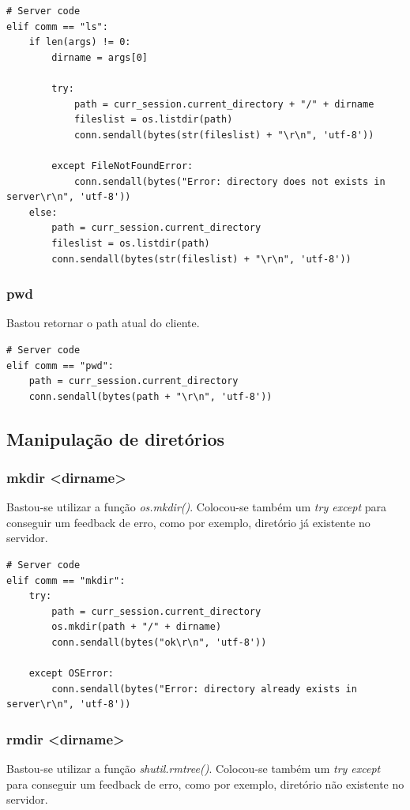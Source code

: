\documentclass[conference]{IEEEtran}
\begin{document}
\begin{lstlisting}
# Server code
elif comm == "ls":
	if len(args) != 0:
	    dirname = args[0]
	    
	    try:
	    	path = curr_session.current_directory + "/" + dirname
	    	fileslist = os.listdir(path)
			conn.sendall(bytes(str(fileslist) + "\r\n", 'utf-8'))

	    except FileNotFoundError:
			conn.sendall(bytes("Error: directory does not exists in server\r\n", 'utf-8'))
	else:
		path = curr_session.current_directory
		fileslist = os.listdir(path)
	    conn.sendall(bytes(str(fileslist) + "\r\n", 'utf-8'))
\end{lstlisting}

\subsubsection{pwd} Bastou retornar o path atual do cliente.

\begin{lstlisting}
# Server code
elif comm == "pwd":
	path = curr_session.current_directory
	conn.sendall(bytes(path + "\r\n", 'utf-8'))
\end{lstlisting}

\subsection{Manipulação de diretórios}

\subsubsection{mkdir <dirname>} Bastou-se utilizar a função \textit{os.mkdir()}. Colocou-se também um \textit{try except} para conseguir um feedback de erro, como por exemplo, diretório já existente no servidor.

\begin{lstlisting}
# Server code
elif comm == "mkdir":
	try:
		path = curr_session.current_directory
	    os.mkdir(path + "/" + dirname)
	    conn.sendall(bytes("ok\r\n", 'utf-8'))

	except OSError:
	    conn.sendall(bytes("Error: directory already exists in server\r\n", 'utf-8'))
\end{lstlisting}

\subsubsection{rmdir <dirname>} Bastou-se utilizar a função \textit{shutil.rmtree()}. Colocou-se também um \textit{try except} para conseguir um feedback de erro, como por exemplo, diretório não existente no servidor.
\end{document}

